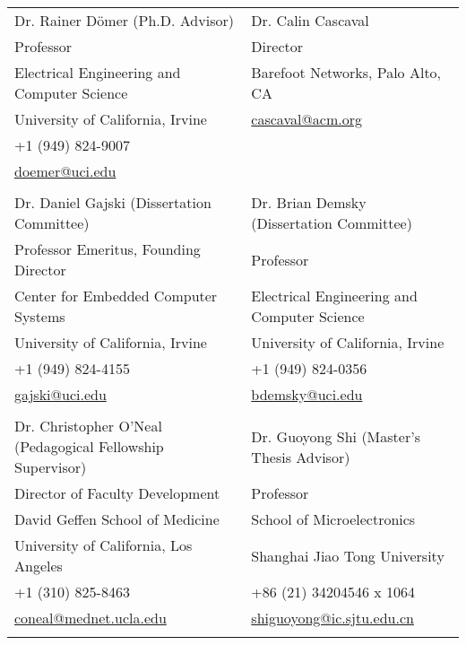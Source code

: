 {\begin{tabular*}{6.5in}{l@{\extracolsep{\fill}}l}

Dr. Rainer D\"{o}mer (Ph.D. Advisor)                                   & Dr. Calin Cascaval \\
Professor                                                                            & Director \\
Electrical Engineering and Computer Science                            &Barefoot Networks, Palo Alto, CA \\
University of California, Irvine                                       &  \href{mailto:cascaval@acm.org}{cascaval@acm.org} \\
+1 (949) 824-9007                                                      & \\
\href{mailto:doemer@uci.edu}{doemer@uci.edu}                           & \\
&\\

Dr. Daniel Gajski (Dissertation Committee)                             & Dr. Brian Demsky (Dissertation Committee) \\
Professor Emeritus, Founding Director                                  & Professor \\
Center for Embedded Computer Systems                                   & Electrical Engineering and Computer Science \\
University of California, Irvine                                       & University of California, Irvine \\
+1 (949) 824-4155                                                      & +1 (949) 824-0356 \\
\href{mailto:gajski@uci.edu}{gajski@uci.edu}                           & \href{mailto:bdemsky@uci.edu}{bdemsky@uci.edu} \\
&\\

Dr. Christopher O'Neal (Pedagogical Fellowship Supervisor)             & Dr. Guoyong Shi (Master's Thesis Advisor)\\
Director of Faculty Development                                        & Professor \\
David Geffen School of Medicine                                        & School of Microelectronics\\
University of California, Los Angeles                                  & Shanghai Jiao Tong University\\
+1 (310) 825-8463                                                      & +86 (21) 34204546 x 1064\\
\href{mailto:coneal@mednet.ucla.edu}{coneal@mednet.ucla.edu}           & \href{mailto:shiguoyong@ic.sjtu.edu.cn}{shiguoyong@ic.sjtu.edu.cn}\\
&\\
\end{tabular*}}



